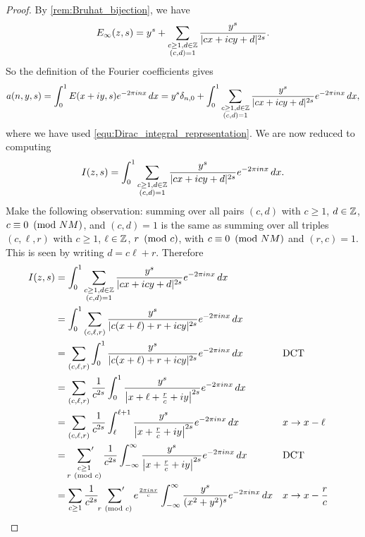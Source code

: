       \begin{proof}
        By \cref{rem:Bruhat_bijection}, we have
        \[
          E_{\infty}(z,s) = y^{s}+\sum_{\substack{c \ge 1, d \in \mathbb{Z} \\ (c,d) = 1}}\frac{y^{s}}{|cx+icy+d|^{2s}}.
        \]
        So the definition of the Fourier coefficients gives
        \begin{equation}\label{equ:real-analytic_Eisenstein_fourier_coefficient_definition}
          a(n,y,s) = \int_{0}^{1}E(x+iy,s)e^{-2\pi inx}\,dx = y^{s}\delta_{n,0}+\int_{0}^{1}\sum_{\substack{c \ge 1, d \in \mathbb{Z} \\ (c,d) = 1}}\frac{y^{s}}{|cx+icy+d|^{2s}}e^{-2\pi inx}\,dx,
        \end{equation}
        where we have used \cref{equ:Dirac_integral_representation}. We are now reduced to computing
        \[
          I(z,s) = \int_{0}^{1}\sum_{\substack{c \ge 1, d \in \mathbb{Z} \\ (c,d) = 1}}\frac{y^{s}}{|cx+icy+d|^{2s}}e^{-2\pi inx}\,dx.
        \]
        Make the following observation: summing over all pairs $(c,d)$ with $c \ge 1$, $d \in \mathbb{Z}$, $c \equiv 0 \ \left(\text{mod }NM\right)$, and $(c,d) = 1$ is the same as summing over all triples $(c,\ell,r)$ with $c \ge 1$, $\ell \in \mathbb{Z}$, $r \ \left(\text{mod }c\right)$, with $c \equiv 0 \ \left(\text{mod }NM\right)$ and $(r,c) = 1$. This is seen by writing $d = c\ell+r$. Therefore
        \begin{align*}
          I(z,s) &= \int_{0}^{1}\sum_{\substack{c \ge 1, d \in \Z \\ (c,d) = 1}}\frac{y^{s}}{|cx+icy+d|^{2s}}e^{-2\pi inx}\,dx \\
          &= \int_{0}^{1}\sum_{(c,\ell,r)}\frac{y^{s}}{|c(x+\ell)+r+icy|^{2s}}e^{-2\pi inx}\,dx \\
          &= \sum_{(c,\ell,r)}\int_{0}^{1}\frac{y^{s}}{|c(x+\ell)+r+icy|^{2s}}e^{-2\pi inx}\,dx &&\text{DCT} \\
          &= \sum_{(c,\ell,r)}\frac{1}{c^{2s}}\int_{0}^{1}\frac{y^{s}}{\left|x+\ell+\frac{r}{c}+iy\right|^{2s}}e^{-2\pi inx}\,dx \\
          &= \sum_{(c,\ell,r)}\frac{1}{c^{2s}}\int_{\ell}^{\ell+1}\frac{y^{s}}{\left|x+\frac{r}{c}+iy\right|^{2s}}e^{-2\pi inx}\,dx &&\text{$x \to x-\ell$} \\
          &= \psum_{\substack{c \ge 1 \\ r \tmod{c}}}\frac{1}{c^{2s}}\int_{-\infty}^{\infty}\frac{y^{s}}{\left|x+\frac{r}{c}+iy\right|^{2s}}e^{-2\pi inx}\,dx &&\text{DCT} \\
          &= \sum_{c \ge 1}\frac{1}{c^{2s}}\psum_{r \tmod{c}}e^{\frac{2\pi inr}{c}}\int_{-\infty}^{\infty}\frac{y^{s}}{(x^{2}+y^{2})^{s}}e^{-2\pi inx}\,dx &&\text{$x \to x-\frac{r}{c}$} \\

\end{align*}
\end{proof}
